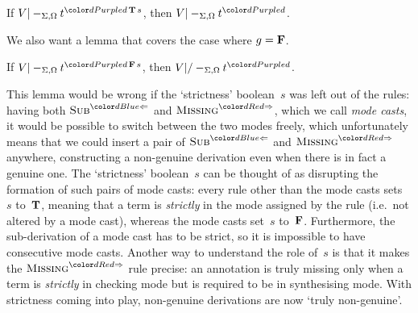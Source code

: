 \begin{lemma}\label{thm:Pre?-true}
If $V |-_{\Sigma,\Omega} t^{\dir{d}\,\BTrue\,s}$, then $V |-_{\Sigma,\Omega} t^\dir{d}$.
\end{lemma}


We also want a lemma that covers the case where $g = \mathbf{F}$.

\begin{lemma}\label{thm:Pre?-false}
If $V |-_{\Sigma,\Omega} t^{\dir{d}\,\BFalse\,s}$, then $V |/-_{\Sigma,\Omega} t^\dir{d}$.
\end{lemma}

This lemma would be wrong if the `strictness' boolean~$s$ was left out of the rules: having both $\ChkRule{Sub}$ and $\SynRule{Missing}$, which we call \emph{mode casts}, it would be possible to switch between the two modes freely, which unfortunately means that we could insert a pair of $\ChkRule{Sub}$ and $\SynRule{Missing}$ anywhere, constructing a non-genuine derivation even when there is in fact a genuine one.
The `strictness' boolean~$s$ can be thought of as disrupting the formation of such pairs of mode casts: every rule other than the mode casts sets~$s$ to~$\mathbf{T}$, meaning that a term is \emph{strictly} in the mode assigned by the rule (i.e.~not altered by a mode cast), whereas the mode casts set~$s$ to~$\mathbf{F}$.
Furthermore, the sub-derivation of a mode cast has to be strict, so it is impossible to have consecutive mode casts.
Another way to understand the role of~$s$ is that it makes the $\SynRule{Missing}$ rule precise: an annotation is truly missing only when a term is \emph{strictly} in checking mode but is required to be in synthesising mode.
With strictness coming into play, non-genuine derivations are now `truly non-genuine'.

